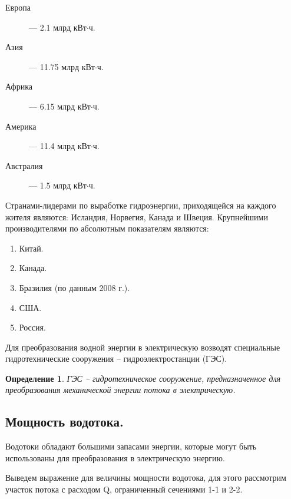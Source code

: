 \begin{description}
\item[Европа] --- 2.1 млрд кВт$\cdot$ч.
\item[Азия] --- 11.75 млрд кВт$\cdot$ч.
\item[Африка] --- 6.15 млрд кВт$\cdot$ч.
\item[Америка] --- 11.4 млрд кВт$\cdot$ч.
\item[Австралия] --- 1.5 млрд кВт$\cdot$ч.
\end{description}

Странами-лидерами по выработке гидроэнергии, приходящейся на каждого жителя являются: Исландия, Норвегия, Канада и Швеция. Крупнейшими производителями по абсолютным показателям являются:
\begin{enumerate}
\item Китай. 
\item Канада.
\item Бразилия (по данным 2008 г.).
\item США. 
\item Россия.
\end{enumerate}

Для преобразования водной энергии в электрическую возводят специальные гидротехнические сооружения -- гидроэлектростанции (ГЭС).

\newtheorem{opred}{Определение}[section]
\begin{opred}
   ГЭС -- гидротехническое сооружение, предназначенное для преобразования механической энергии потока в электрическую.
\end{opred}





\subsection {Мощность водотока.}

Водотоки обладают большими запасами энергии, которые могут быть использованы для преобразования в электрическую энергию.

Выведем выражение для величины мощности водотока, для этого рассмотрим участок потока с расходом Q, ограниченный сечениями 1-1 и 2-2.

